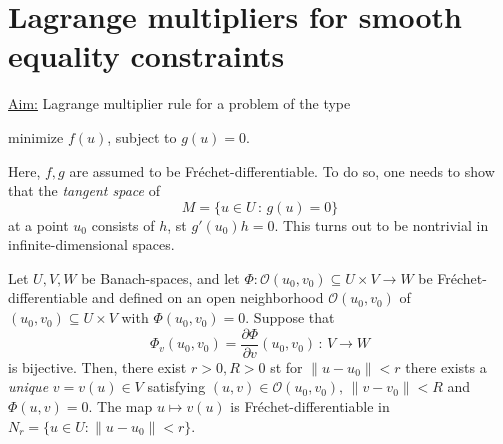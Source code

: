 \documentclass[../skript.tex]{subfiles}
\begin{document}
\section{Lagrange multipliers for smooth equality constraints}\label{sec:c1e3}
\underline{Aim:} Lagrange multiplier rule for a problem of the type
\begin{problemnonumb}
	minimize $f(u)$, subject to $g(u) = 0$.
\end{problemnonumb}
Here, $f,g$ are assumed to be Fréchet-differentiable. To do so, one needs to show that the \emph{tangent space} of
\[
	M=\{u\in U\,:\,g(u)=0\}
\]
at a point $u_0$ consists of $h$, \ac{st} $g'(u_0)h = 0$. This turns out to be nontrivial in infinite-dimensional spaces.
\begin{theorem}\label{thm:c1e26}
	Let $U,V,W$ be Banach-spaces, and let $\Phi:\mathcal{O}(u_0,v_0)\subseteq U\times V\to W$ %
	be Fréchet-differentiable and defined on an open neighborhood $\mathcal{O}(u_0,v_0)$ of $(u_0,v_0)\subseteq U\times V$ with $\Phi(u_0,v_0) = 0$.
	Suppose that 
	\[
		\Phi_v(u_0,v_0)=\frac{\partial\Phi}{\partial v}(u_0,v_0)\,:\,V\to W
	\]
	is bijective. Then, there exist $r>0, R>0$ \ac{st} for $\|u-u_0\|<r$ there exists a \emph{unique} $v=v(u)\in V$ satisfying $(u,v)\in\mathcal{O}(u_0,v_0),\,\|v-v_0\|<R$ and $\Phi(u,v) = 0$. The map $u\mapsto v(u)$ is Fréchet-differentiable in $N_r=\{u\in U:\|u-u_0\|<r\}$. 
\end{theorem}
\end{document}
